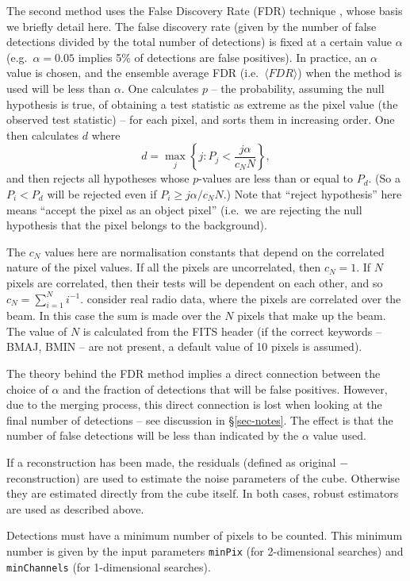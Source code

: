 \documentclass[12pt,a4paper]{article}
\newcommand{\eg}{e.g.\ }
\newcommand{\ie}{i.e.\ }
\begin{document}
The second method uses the False Discovery Rate (FDR) technique
\citep{miller01,hopkins02}, whose basis we briefly detail here. The
false discovery rate (given by the number of false detections divided
by the total number of detections) is fixed at a certain value
$\alpha$ (\eg $\alpha=0.05$ implies 5\% of detections are false
positives). In practice, an $\alpha$ value is chosen, and the ensemble
average FDR (\ie $\langle FDR \rangle$) when the method is used will
be less than $\alpha$.  One calculates $p$ -- the probability,
assuming the null hypothesis is true, of obtaining a test statistic as
extreme as the pixel value (the observed test statistic) -- for each
pixel, and sorts them in increasing order. One then calculates $d$
where
\[
d = \max_j \left\{ j : P_j < \frac{j\alpha}{c_N N} \right\},
\]
and then rejects all hypotheses whose $p$-values are less than or equal
to $P_d$. (So a $P_i<P_d$ will be rejected even if $P_i \geq
j\alpha/c_N N$.) Note that ``reject hypothesis'' here means ``accept
the pixel as an object pixel'' (\ie we are rejecting the null
hypothesis that the pixel belongs to the background). 

The $c_N$ values here are normalisation constants that depend on the
correlated nature of the pixel values. If all the pixels are
uncorrelated, then $c_N=1$. If $N$ pixels are correlated, then their
tests will be dependent on each other, and so $c_N = \sum_{i=1}^N
i^{-1}$. \citet{hopkins02} consider real radio data, where the pixels
are correlated over the beam. In this case the sum is made over the
$N$ pixels that make up the beam. The value of $N$ is calculated from
the FITS header (if the correct keywords -- BMAJ, BMIN -- are not
present, a default value of 10 pixels is assumed).

The theory behind the FDR method implies a direct connection between the 
choice of $\alpha$ and the fraction of detections that will be false 
positives. However, due to the merging process, this direct connection is
lost when looking at the final number of detections -- see discussion in
\S\ref{sec-notes}. The effect is that the number of false detections will
be less than indicated by the $\alpha$ value used.

If a reconstruction has been made, the residuals (defined as original
$-$ reconstruction) are used to estimate the noise parameters of the
cube. Otherwise they are estimated directly from the cube itself. In
both cases, robust estimators are used as described above.

Detections must have a minimum number of pixels to be counted. This
minimum number is given by the input parameters \texttt{minPix} (for
2-dimensional searches) and \texttt{minChannels} (for 1-dimensional
searches).
\end{document}
